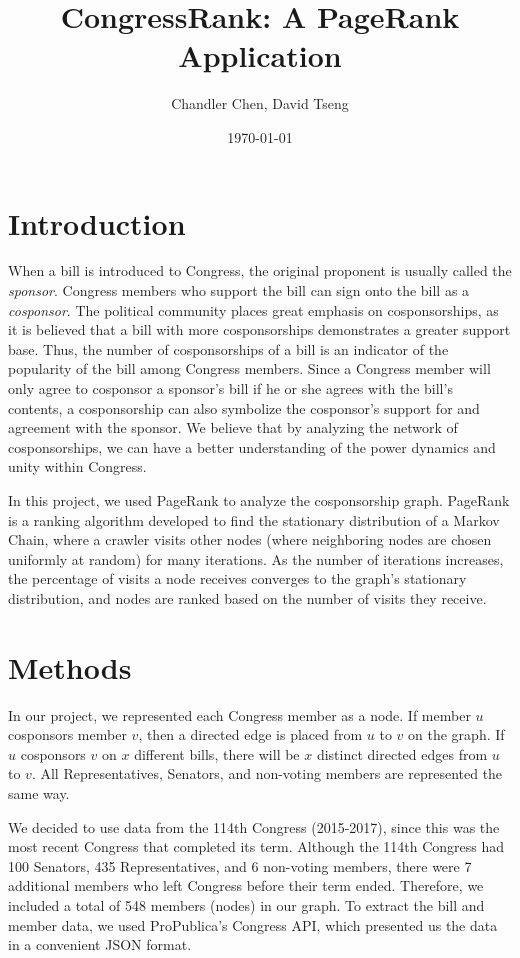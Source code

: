 \documentclass[11pt]{article}
\begin{document}
\title{CongressRank: A PageRank Application}
\author{Chandler Chen, David Tseng}
\date{\today}
\maketitle

\section*{Introduction}
When a bill is introduced to Congress, the original proponent is usually called the \textit{sponsor}. Congress members who support the bill can sign onto the bill as a \textit{cosponsor}. The political community places great emphasis on cosponsorships, as it is believed that a bill with more cosponsorships demonstrates a greater support base. Thus, the number of cosponsorships of a bill is an indicator of the popularity of the bill among Congress members. Since a Congress member will only agree to cosponsor a sponsor's bill if he or she agrees with the bill's contents, a cosponsorship can also symbolize the cosponsor's support for and agreement with the sponsor. We believe that by analyzing the network of cosponsorships, we can have a better understanding of the power dynamics and unity within Congress. 

In this project, we used PageRank to analyze the cosponsorship graph. PageRank is a ranking algorithm developed to find the stationary distribution of a Markov Chain, where a crawler visits other nodes (where neighboring nodes are chosen uniformly at random) for many iterations. As the number of iterations increases, the percentage of visits a node receives converges to the graph's stationary distribution, and nodes are ranked based on the number of visits they receive. 



\section*{Methods}
In our project, we represented each Congress member as a node. If member $u$ cosponsors member $v$, then a directed edge is placed from $u$ to $v$ on the graph. If $u$ cosponsors $v$ on $x$ different bills, there will be $x$ distinct directed edges from $u$ to $v$. All Representatives, Senators, and non-voting members are represented the same way. 

We decided to use data from the 114th Congress (2015-2017), since this was the most recent Congress that completed its term. Although the 114th Congress had 100 Senators, 435 Representatives, and 6 non-voting members, there were 7 additional members who left Congress before their term ended. Therefore, we included a total of 548 members (nodes) in our graph. To extract the bill and member data, we used ProPublica's Congress API, which presented us the data in a convenient JSON format. 
\end{document}

